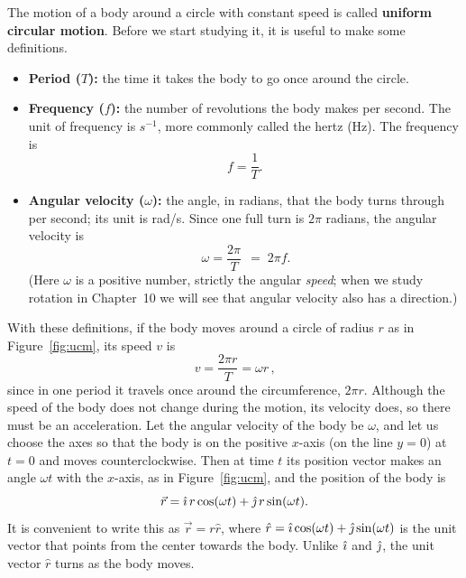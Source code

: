 \documentclass[11pt,a4paper]{article}
\begin{document}
The motion of a body around a circle with constant speed is called \textbf{uniform circular
motion}. Before we start studying it, it is useful to make some definitions.
\begin{itemize}
  \item \textbf{Period ($T$):} the time it takes the body to go once around the circle.
  \item \textbf{Frequency ($f$):} the number of revolutions the body makes per second. The unit of
    frequency is $\unit{s^{-1}}$, more commonly called the hertz (\unit{Hz}). The frequency is
    \begin{equation}\label{eq:f}
      f = \frac{1}{T} .
    \end{equation}
  \item \textbf{Angular velocity ($\omega$):} the angle, in radians, that the body turns through
    per second; its unit is \unit{rad/s}. Since one full turn is $2\pi$ radians, the angular
    velocity is
    \begin{equation}\label{eq:omega}
      \boxed{\,\omega = \frac{2\pi}{T}\,} \;=\; 2\pi f .
    \end{equation}
    (Here $\omega$ is a positive number, strictly the angular \emph{speed}; when we study rotation
    in Chapter~10 we will see that angular velocity also has a direction.)
\end{itemize}
With these definitions, if the body moves around a circle of radius $r$ as in Figure~\ref{fig:ucm},
its speed $v$ is
\begin{equation}\label{eq:v-omega-r}
  \boxed{\,v = \frac{2\pi r}{T} = \omega r\,} ,
\end{equation}
since in one period it travels once around the circumference, $2\pi r$. Although the speed of the
body does not change during the motion, its velocity does, so there must be an acceleration. Let
the angular velocity of the body be $\omega$, and let us choose the axes so that the body is on the
positive $x$-axis (on the line $y = 0$) at $t = 0$ and moves counterclockwise. Then at time $t$ its
position vector makes an angle $\omega t$ with the $x$-axis, as in Figure~\ref{fig:ucm}, and the
position of the body is
\begin{equation}\label{eq:ucm-r}
  \vec{r} = \hat{\imath}\, r\cos(\omega t) + \hat{\jmath}\, r\sin(\omega t) .
\end{equation}
It is convenient to write this as $\vec{r} = r\hat{r}$, where
$\hat{r} = \hat{\imath}\cos(\omega t) + \hat{\jmath}\sin(\omega t)$ is the unit vector that points from the center
towards the body. Unlike $\hat{\imath}$ and $\hat{\jmath}$, the unit vector $\hat{r}$ turns as the body moves.
\end{document}
